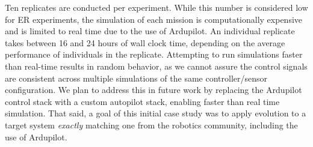 Ten replicates are conducted per experiment. 
%
While this number is considered low for ER experiments, 
the simulation of each mission is computationally expensive 
and is limited to real time due to the use of Ardupilot. 
%
%
An individual replicate takes between 16 and 24 hours of wall clock time, depending on the average performance of individuals in the replicate.
Attempting to run simulations faster than real-time results in random behavior,
as we cannot assure the control signals are consistent across multiple simulations
of the same controller/sensor configuration. 
%
We plan to address this in future work by replacing the Ardupilot control stack
with a custom autopilot stack, enabling faster than real time simulation. 
%
That said, a goal of this initial case study was to apply evolution to a target system
{\em exactly} matching one from the robotics community, including the use of Ardupilot.





